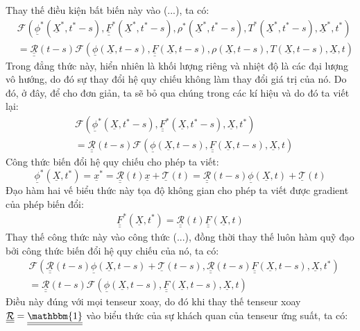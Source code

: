 \documentclass[../../../main.tex]{subfiles}
\begin{document}
	Thay thế điều kiện bất biến này vào (...), ta có:
		\[
			\begin{aligned}
				&\mathcal{F}\left(\underline{\phi}^*\left(\underline{X}^*,t^*-s\right),\underline{\underline{F}}^*\left(\underline{X}^*,t^*-s\right),\rho^*\left(\underline{X}^*,t^*-s\right),T^*\left(\underline{X}^*,t^*-s\right),\underline{X}^*,t^*\right)\\
				&=\underline{\underline{\mathcal{R}}}\left(t-s\right)\mathcal{F}\left(\underline{\phi}\left(\underline{X},t-s\right),\underline{\underline{F}}\left(\underline{X},t-s\right),\rho\left(\underline{X},t-s\right),T\left(\underline{X},t-s\right),\underline{X},t\right)
			\end{aligned}
		\]
	Trong đẳng thức này, hiển nhiên là khối lượng riêng và nhiệt độ là các đại lượng vô hướng, do đó sự thay đổi hệ quy chiếu không làm thay đổi giá trị của nó. Do đó, ở đây, để cho đơn giản, ta sẽ bỏ qua chúng trong các kí hiệu và do đó ta viết lại:
		\[
			\begin{aligned}
				&\mathcal{F}\left(\underline{\phi}^*\left(\underline{X},t^*-s\right),\underline{\underline{F}}^*\left(\underline{X},t^*-s\right),\underline{X},t^*\right)\\
				&=\underline{\underline{\mathcal{R}}}\left(t-s\right)\mathcal{F}\left(\underline{\phi}\left(\underline{X},t-s\right),\underline{\underline{F}}\left(\underline{X},t-s\right),\underline{X},t\right)
			\end{aligned}
		\]
	Công thức biến đổi hệ quy chiếu cho phép ta viết:
		\[
			\underline{\phi}^*\left(\underline{X},t^*\right)=\underline{x}^*=\underline{\underline{\mathcal{R}}}\left(t\right)\underline{x}+\underline{\mathcal{T}}\left(t\right)=\underline{\underline{\mathcal{R}}}\left(t-s\right)\underline{\phi}\left(\underline{X},t\right)+\underline{\mathcal{T}}\left(t\right)
		\]
	Đạo hàm hai vế biểu thức này tọa độ không gian cho phép ta viết được gradient của phép biến đổi: 
		\begin{align}
			\underline{\underline{F}}^*\left(\underline{X},t^*\right)=\underline{\underline{\mathcal{R}}}\left(t\right)\underline{\underline{F}}\left(\underline{X},t\right)
		\end{align}
	Thay thế công thức này vào công thức (...), đồng thời thay thế luôn hàm quỹ đạo bởi công thức biến đổi hệ quy chiếu của nó, ta có:
		\[
			\begin{aligned}
				&\mathcal{F}\left(\underline{\underline{\mathcal{R}}}\left(t-s\right)\underline{\phi}\left(\underline{X},t-s\right)+\underline{\mathcal{T}}\left(t-s\right),\underline{\underline{\mathcal{R}}}\left(t-s\right)\underline{\underline{F}}\left(\underline{X},t-s\right),\underline{X},t^*\right)\\
				&=\underline{\underline{\mathcal{R}}}\left(t-s\right)\mathcal{F}\left(\underline{\phi}\left(\underline{X},t-s\right),\underline{\underline{F}}\left(\underline{X},t-s\right),\underline{X},t\right)
			\end{aligned}
		\]
	Điều này đúng với mọi tenseur xoay, do đó khi thay thế tenseur xoay $\underline{\underline{\mathcal{R}}}=\underline{\underline{\mathbbm{1}}}$ vào biểu thức của sự khách quan của tenseur ứng suất, ta có:
\end{document}
